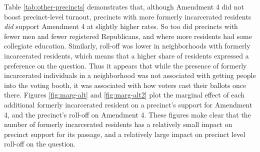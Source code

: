 \documentclass[
  12pt,
]{article}
\begin{document}
\begin{singlespace}


\end{singlespace}

Table \ref{tab:other-precincts} demonstrates that, although Amendment 4 did not boost precinct-level turnout, precincts with more formerly incarcerated residents \emph{did} support Amendment 4 at slightly higher rates. So too did precincts with fewer men and fewer registered Republicans, and where more residents had some collegiate education. Similarly, roll-off was lower in neighborhoods with formerly incarcerated residents, which means that a higher share of residents expressed a preference on the question. Thus it appears that while the presence of formerly incarcerated individuals in a neighborhood was not associated with getting people into the voting booth, it was associated with how voters cast their ballots once there. Figures \ref{fig:marg-alt} and \ref{fig:marg-alt2} plot the marginal effect of each additional formerly incarcerated resident on a precinct's support for Amendment 4, and the precinct's roll-off on Amendment 4. These figures make clear that the number of formerly incarcerated residents has a relatively small impact on precinct support for its passage, and a relatively large impact on precinct level roll-off on the question.
\end{document}

